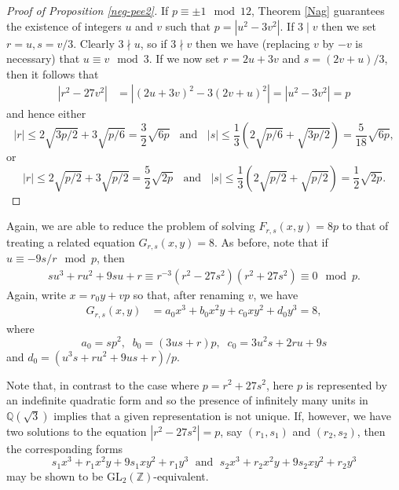 \begin{proof}[Proof of Proposition \ref{neg-pee2}]
If $p \equiv \pm 1 \mod{12}$, Theorem  \ref{Nag} guarantees the existence of integers $u$ and $v$ such that $p = |u^2-3v^2|$.
If $3\mid v$ then we set $r=u, s=v/3$. 
Clearly $3\nmid u$, so if $3 \nmid v$ then we have (replacing $v$ by $-v$ is necessary) that $u \equiv v \mod{3}$. If we now 
set $r=2u+3v$ and $s=(2v+u)/3$, then it follows that
\begin{align*}
|r^2 - 27 v^2| &= |(2u+3v)^2 - 3 (2v+u)^2| = |u^2 - 3 v^2|  = p
\end{align*}
and hence either 
$$
|r| \leq 2 \sqrt{3p/2} + 3 \sqrt{p/6} = \frac{3}{2} \sqrt{6 p}  \; \; \mbox{ and } \; \; 
|s| \leq \frac{1}{3} (2 \sqrt{p/6}  + \sqrt{3p/2} ) = \frac{5}{18} \sqrt{6p},
$$
or
$$
|r| \leq 2 \sqrt{p/2} + 3 \sqrt{p/2} = \frac{5}{2} \sqrt{2 p} \; \; \mbox{ and } \; \; 
|s| \leq \frac{1}{3} (2 \sqrt{p/2}  + \sqrt{p/2} ) = \frac{1}{2} \sqrt{2 p}.
$$
\end{proof}

Again, we are able to reduce the problem of solving $F_{r,s}(x,y)=8p$ to that of treating a related 
equation $G_{r,s}(x,y)=8$. As before, note that if $u \equiv -9s/r 
\mod{p}$, then
\begin{align*}
s u^3 + r u^2 + 9 s u + r  \equiv r^{-3} (r^2-27 s^2) (r^2+27s^2) \equiv 0 \mod{p}.
\end{align*}
Again, write $x=r_0y+vp$ so that, after renaming $v$, we have
\begin{align*}
G_{r,s}(x,y) &= a_0 x^3 + b_0 x^2 y + c_0 x y^2 + d_0 y^3 =8,
\end{align*}
where
$$
a_0 = s p^2, \; \; 
b_0 = (3 u s+r) p, \; \;
c_0 = 3 u^2 s+2 r u + 9s
$$
and $d_0 = (u^3 s+r u^2 + 9 u s + r)/p$.

Note that, in contrast to the case where $p =r^2 + 27s^2$, here $p$ is represented by an indefinite quadratic form and so the presence of infinitely many units in $\mathbb{Q}(\sqrt{3})$ implies that a given representation is not unique. 
If, however, we have two solutions to the equation $|r^2-27s^2|=p$, say $(r_1,s_1)$ and $(r_2,s_2)$, then the corresponding forms
$$
s_1x^3+r_1 x^2y + 9s_1 x y^2 + r_1 y^3 \; \mbox{ and } \; s_2x^3+r_2 x^2y + 9s_2 x y^2 + r_2 y^3
$$
may be shown to be $\mbox{GL}_2 ( \mathbb{Z})$-equivalent.

% 

